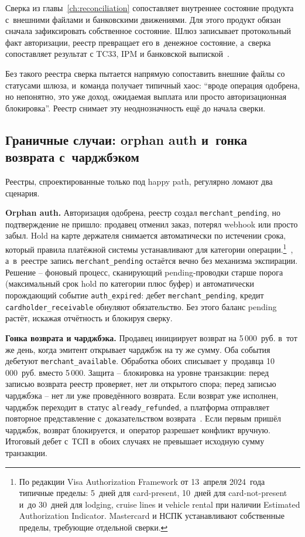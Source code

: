 Сверка из главы~\ref{ch:reconciliation} сопоставляет внутреннее
состояние продукта с~внешними файлами и банковскими движениями.
Для этого продукт обязан сначала зафиксировать собственное состояние.
Шлюз записывает протокольный факт авторизации, реестр превращает его
в~денежное состояние, а~сверка сопоставляет результат с TC33, IPM
и банковской выпиской~\cite{visa-core-rules,mc-tpr,mc-switching-services}.

Без такого реестра сверка пытается напрямую сопоставить внешние
файлы со статусами шлюза, и~команда получает типичный хаос:
\enquote{вроде операция одобрена, но непонятно, это уже доход,
ожидаемая выплата или просто авторизационная блокировка}. Реестр
снимает эту неоднозначность ещё до начала сверки.

\subsection*{Граничные случаи: orphan auth и~гонка возврата с~чарджбэком}

Реестры, спроектированные только под happy path, регулярно ломают
два сценария.

\textbf{Orphan auth.} Авторизация одобрена, реестр создал
\texttt{merchant\_pending}, но подтверждение не пришло: продавец
отменил заказ, потерял webhook или просто забыл. Hold на карте
держателя снимается автоматически по истечении срока, который
правила платёжной системы устанавливают для категории
операции.\footnote{По редакции Visa Authorization Framework
от 13~апреля 2024~года типичные пределы: 5~дней для card-present,
10~дней для card-not-present и~до 30~дней для lodging, cruise lines
и vehicle rental при наличии Estimated Authorization Indicator.
Mastercard и НСПК устанавливают собственные пределы, требующие
отдельной сверки.}~\cite{visa-core-rules,mc-rules,nspk-mir-rules},
а~в~реестре запись \texttt{merchant\_pending} остаётся вечно
без механизма экспирации. Решение -- фоновый процесс, сканирующий
pending-проводки старше порога (максимальный срок hold по категории
плюс буфер) и автоматически порождающий событие
\texttt{auth\_expired}: дебет \texttt{merchant\_pending}, кредит
\texttt{cardholder\_receivable} обнуляют обязательство. Без этого
баланс pending растёт, искажая отчётность и блокируя сверку.

\textbf{Гонка возврата и чарджбэка.} Продавец инициирует возврат
на 5\,000~руб. в~тот же день, когда эмитент открывает чарджбэк
на ту же сумму. Оба события дебетуют \texttt{merchant\_available}.
Обработка обоих списывает у~продавца 10\,000~руб. вместо 5\,000.
Защита -- блокировка на уровне транзакции: перед записью возврата
реестр проверяет, нет ли открытого спора; перед записью чарджбэка --
нет ли уже проведённого возврата. Если возврат уже исполнен, чарджбэк
переходит в~статус \texttt{already\_refunded}, а платформа отправляет
повторное представление с~доказательством
возврата~\cite{mc-chargeback-guide}. Если первым пришёл чарджбэк,
возврат блокируется, и~оператор разрешает конфликт вручную.
Итоговый дебет с~ТСП в~обоих случаях не превышает исходную сумму
транзакции.

